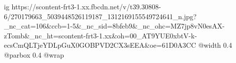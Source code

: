  
 
 
 
 

\ifcmt
  ig https://scontent-frt3-1.xx.fbcdn.net/v/t39.30808-6/270179663_5039448526119187_1312169155549724641_n.jpg?_nc_cat=106&ccb=1-5&_nc_sid=8bfeb9&_nc_ohc=MZ7jp8vN0esAX-zTomb&_nc_ht=scontent-frt3-1.xx&oh=00_AT9YUE0xbtV-k-ecsCmQLTjeYDLpGuX0GOBPVD2CX3sEEA&oe=61D0A3CC
  @width 0.4
  @parbox 0.4
  @wrap \parpic[r]
\fi
